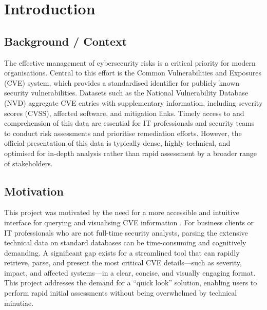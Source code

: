 \documentclass[12pt,a4paper]{article}
\begin{document}
    \clearpage
    \tableofcontents
    \clearpage
    \section{Introduction}
    \subsection{Background / Context}
    The effective management of cybersecurity risks is a critical priority for modern organisations. Central to this effort is the Common Vulnerabilities and Exposures (CVE)\cite{CVE_Program}\cite{National_Vulnerability_Database} system, which provides a standardised identifier for publicly known security vulnerabilities.
    Datasets such as the National Vulnerability Database (NVD)\cite{National_Vulnerability_Database} aggregate CVE entries with supplementary information, including severity scores (CVSS)\cite{CVSS_v3_Scoring_Systems_Documentation}, affected software, and mitigation links.
    Timely access to and comprehension of this data are essential for IT professionals and security teams to conduct risk assessments and prioritise remediation efforts.
    However, the official presentation of this data is typically dense, highly technical, and optimised for in-depth analysis rather than rapid assessment by a broader range of stakeholders.
    \subsection{Motivation}
    This project was motivated by the need for a more accessible and intuitive interface for querying and visualising CVE information \cite{CVE_Program}\cite{National_Vulnerability_Database}.
    For business clients or IT professionals who are not full-time security analysts, parsing the extensive technical data on standard databases can be time-consuming and cognitively demanding.
    A significant gap exists for a streamlined tool that can rapidly retrieve, parse, and present the most critical CVE details—such as severity, impact, and affected systems—in a clear, concise, and visually engaging format.
    This project addresses the demand for a ``quick look'' solution, enabling users to perform rapid initial assessments without being overwhelmed by technical minutiae.
\end{document}
